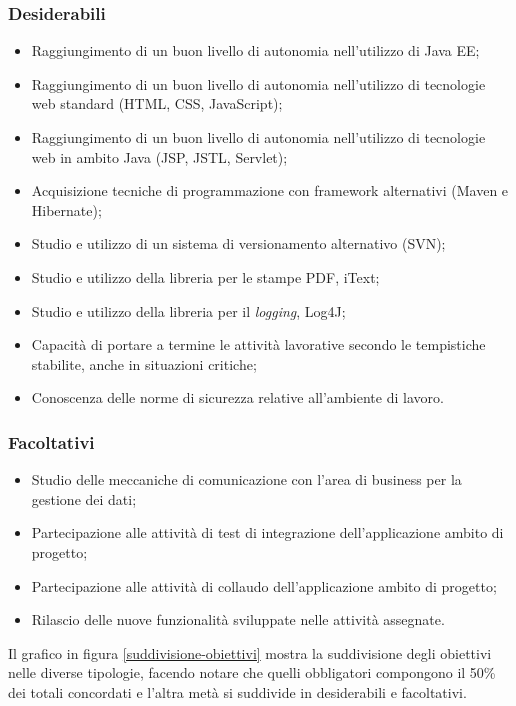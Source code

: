 	\subsubsection{Desiderabili}		
		\begin{itemize}
			\item Raggiungimento di un buon livello di autonomia nell'utilizzo di Java EE;
			\item Raggiungimento di un buon livello di autonomia nell'utilizzo di tecnologie web standard (HTML, CSS, JavaScript);
			\item Raggiungimento di un buon livello di autonomia nell'utilizzo di tecnologie web in ambito Java (JSP, JSTL, Servlet\glossario );
			\item Acquisizione tecniche di programmazione con framework alternativi (Maven e Hibernate);
			\item Studio e utilizzo di un sistema di versionamento alternativo (SVN);
			\item Studio e utilizzo della libreria per le stampe PDF, iText;
			\item Studio e utilizzo della libreria per il \textit{logging}, Log4J;
			\item Capacità di portare a termine le attività lavorative secondo le tempistiche stabilite, anche in situazioni critiche;
			\item Conoscenza delle norme di sicurezza relative all'ambiente di lavoro.
		\end{itemize}
		
	\subsubsection{Facoltativi}	
		\begin{itemize}
			\item Studio delle meccaniche di comunicazione con l'area di business per la gestione dei dati;
			\item Partecipazione alle attività di test di integrazione dell'applicazione ambito di progetto;
			\item Partecipazione alle attività di collaudo dell'applicazione ambito di progetto;
			\item Rilascio delle nuove funzionalità sviluppate nelle attività assegnate.
		\end{itemize}
		
	Il grafico in figura \ref{suddivisione-obiettivi} mostra la suddivisione degli obiettivi nelle diverse tipologie, facendo notare che quelli obbligatori compongono il 50\% dei totali concordati e l'altra	metà si suddivide in desiderabili e facoltativi.\\
	
